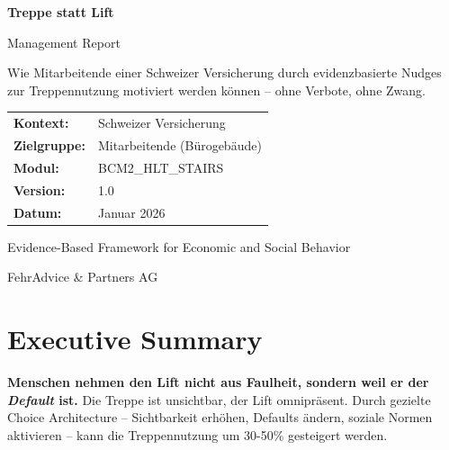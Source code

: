 \documentclass[11pt,a4paper]{article}
\begin{document}
\begin{titlepage}
\centering
\vspace*{3cm}
{\Huge\textcolor{fehrblue}{\textbf{Treppe statt Lift}}\par}
\vspace{0.5cm}
{\Large\textcolor{fehrgray}{Management Report}\par}
\vspace{2cm}

\begin{tcolorbox}[keymessage={Verhaltensbasierte Intervention zur Gesundheitsförderung}]
Wie Mitarbeitende einer Schweizer Versicherung durch evidenzbasierte Nudges zur Treppennutzung motiviert werden können -- ohne Verbote, ohne Zwang.
\end{tcolorbox}

\vspace{2cm}

\begin{tabular}{ll}
\textbf{Kontext:} & Schweizer Versicherung \\
\textbf{Zielgruppe:} & Mitarbeitende (Bürogebäude) \\
\textbf{Modul:} & BCM2\_HLT\_STAIRS \\
\textbf{Version:} & 1.0 \\
\textbf{Datum:} & Januar 2026 \\
\end{tabular}

\vfill

{\large Evidence-Based Framework for Economic and Social Behavior\par}
\vspace{0.5cm}
{\textcolor{fehrgray}{FehrAdvice \& Partners AG}\par}
\end{titlepage}

\section*{\textcolor{fehrblue}{Executive Summary}}

\begin{tcolorbox}[keymessage={Kernbotschaft}]
\textbf{Menschen nehmen den Lift nicht aus Faulheit, sondern weil er der \textit{Default} ist.} Die Treppe ist unsichtbar, der Lift omnipräsent. Durch gezielte Choice Architecture -- Sichtbarkeit erhöhen, Defaults ändern, soziale Normen aktivieren -- kann die Treppennutzung um 30-50\% gesteigert werden.
\end{tcolorbox}
\end{document}
